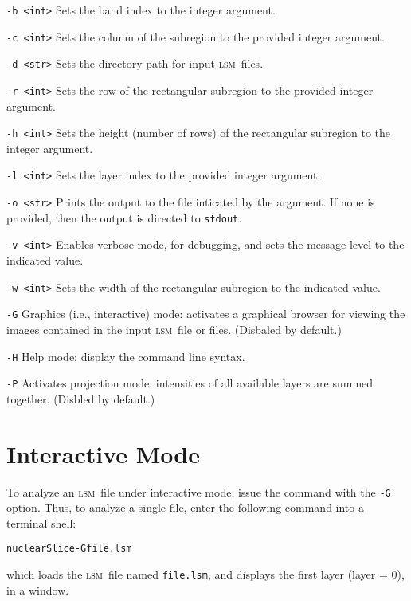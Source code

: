 \documentclass[10pt]{article}
\newcommand{\LSM}{\textsc{lsm}}
\begin{document}
\begin{description}
\item{\tt -b <int>} Sets the band index to the integer argument.
\item{\tt -c <int>} Sets the column of the subregion to the provided integer argument.
\item{\tt -d <str>} Sets the directory path for input \LSM\ files.
\item{\tt -r <int>} Sets the row of the rectangular subregion to the provided integer argument.
\item{\tt -h <int>} Sets the height (number of rows) of the rectangular subregion to the integer
argument.
\item{\tt -l <int>} Sets the layer index to the provided integer argument.
\item{\tt -o <str>} Prints the output to the file inticated by the argument. If none is provided,
then the output is directed to \texttt{stdout}.
\item{\tt -v <int>} Enables verbose mode, for debugging, and sets the message level to the indicated value.
\item{\tt -w <int>} Sets the width of the rectangular subregion to the indicated value.
\item{\tt -G} Graphics (i.e., interactive) mode: activates a graphical browser for viewing the images
contained in the input \LSM\ file or files. (Disbaled by default.)
\item{\tt -H} Help mode: display the command line syntax.
\item{\tt -P} Activates projection mode: intensities of all available layers are summed together. (Disbled by default.)
\end{description}


\section{Interactive Mode}

To analyze an \LSM\ file under interactive mode, issue the command with the \texttt{-G} option.
Thus, to analyze a single file, enter the following command into a terminal shell:
\begin{center}
\begin{alltt}
nuclearSlice -G file.lsm
\end{alltt}
\end{center}
which loads the \LSM\ file named \texttt{file.lsm}, and displays the first layer (layer = 0), in a window.
\end{document}
